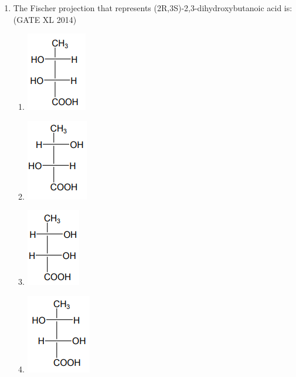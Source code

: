 \documentclass[journal,12pt,onecolumn]{IEEEtran}
\theoremstyle{remark}
\begin{document}
\begin{enumerate}
  \item The Fischer projection that represents (2R,3S)-2,3-dihydroxybutanoic acid is: \\
  \hfill (GATE XL 2014)\\
  \begin{multicols}{2}
  \begin{enumerate}
    \item \includegraphics[width=0.3\columnwidth]{fig12.png}
    \item \includegraphics[width=0.3\columnwidth]{fig13.png}
    \item \includegraphics[width=0.3\columnwidth]{fig14.png}
    \item \includegraphics[width=0.3\columnwidth]{fig15.png}
  \end{enumerate}
  \end{multicols}


\end{enumerate}
\end{document}
